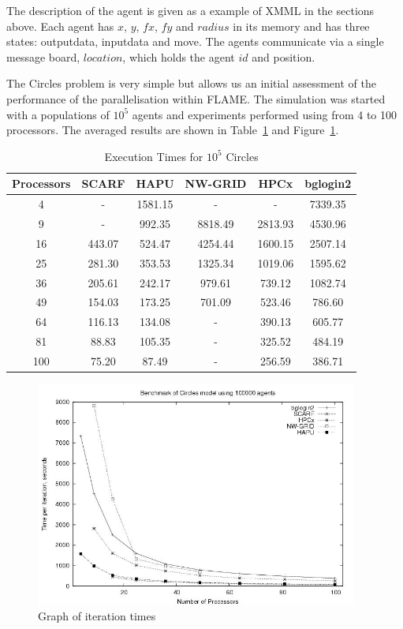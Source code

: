 The description of the agent is given as a example of XMML in the sections above. Each agent has $x$, $y$, $fx$, $fy$ and $radius$ in its memory and has three states: outputdata, inputdata and move. The agents communicate via a single message board, $location$, which holds the agent $id$ and position.

The Circles problem is very simple but allows us an initial assessment of the performance of the parallelisation within FLAME. The simulation was started with a populations of $10^5$  agents and experiments performed using from 4 to 100 processors. The averaged results are shown in Table~\ref{tab:ExecutionTimesForCircles} and Figure~\ref{fig:Circles-graph}.
{
\renewcommand{\arraystretch}{1.25}
\begin{table}[ht]
 \centering
  \begin{tabular}{c|ccccc}
 Processors &SCARF  &HAPU  &NW-GRID &HPCx  &bglogin2 \\ \hline
4 &- &1581.15 &- &- &7339.35    \\
9 &- &992.35 &8818.49 &2813.93 &4530.96 \\
16 &443.07 &524.47 &4254.44 &1600.15 &2507.14   \\
25 &281.30 &353.53 &1325.34 &1019.06 &1595.62   \\
36 &205.61 &242.17 &979.61 &739.12 &1082.74     \\
49 &154.03 &173.25 &701.09 &523.46 &786.60      \\
64 &116.13 &134.08 &- &390.13 &605.77   \\
81 &88.83 &105.35 &- &325.52 &484.19    \\
100 &75.20 &87.49 &- &256.59 &386.71    \\
 
 \end{tabular}
 \caption{Execution Times for $10^5$ Circles}
 \label{tab:ExecutionTimesForCircles}
\end{table}
}
\begin{figure}[ht]
 \centering
  \includegraphics[width=300pt]{Circles-graph.jpg}
 \caption{Graph of iteration times}
 \label{fig:Circles-graph}
\end{figure}

